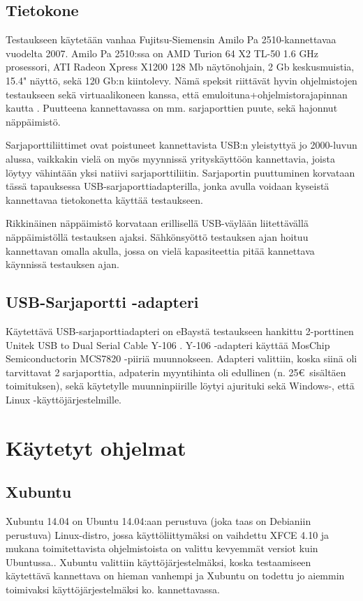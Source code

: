 \documentclass[11pt,a4paper,oneside,article]{memoir}
\begin{document}
\subsection{Tietokone}
Testaukseen käytetään vanhaa Fujitsu-Siemensin Amilo Pa 2510-kannettavaa vuodelta 2007. Amilo Pa 2510:ssa on AMD Turion 64 X2 TL-50 1.6 GHz prosessori, ATI Radeon Xpress X1200 128 Mb näytönohjain, 2 Gb keskusmuistia, 15.4" näyttö, sekä 120 Gb:n kiintolevy. Nämä speksit riittävät hyvin ohjelmistojen testaukseen sekä virtuaalikoneen kanssa, että emuloituna+ohjelmistorajapinnan kautta \cite{fs_amilo:review}. Puutteena kannettavassa on mm. sarjaporttien puute, sekä hajonnut näppäimistö. 

Sarjaporttiliittimet ovat poistuneet kannettavista USB:n yleistyttyä jo 2000-luvun alussa, vaikkakin vielä on myös myynnissä yrityskäyttöön kannettavia, joista löytyy vähintään yksi natiivi sarjaporttiliitin\cite{hp:laptop}. Sarjaportin puuttuminen korvataan tässä tapauksessa USB-sarjaporttiadapterilla, jonka avulla voidaan kyseistä kannettavaa tietokonetta käyttää testaukseen.

Rikkinäinen näppäimistö korvataan erillisellä USB-väylään liitettävällä näppäimistöllä testauksen ajaksi. Sähkönsyöttö testauksen ajan hoituu kannettavan omalla akulla, jossa on vielä kapasiteettia pitää kannettava käynnissä testauksen ajan.

\subsection{USB-Sarjaportti -adapteri}
Käytettävä USB-sarjaporttiadapteri on eBaystä testaukseen hankittu 2-porttinen Unitek USB to Dual Serial Cable Y-106 \cite{serial:unitek}. Y-106 -adapteri käyttää MosChip Semiconductorin MCS7820 -piiriä muunnokseen. Adapteri valittiin, koska siinä oli tarvittavat 2 sarjaporttia, adpaterin myyntihinta oli edullinen (n. 25€ sisältäen toimituksen), sekä käytetylle muunninpiirille löytyi ajurituki sekä Windows-, että Linux -käyttöjärjestelmille.


\section{Käytetyt ohjelmat}
\subsection{Xubuntu}

Xubuntu 14.04 on Ubuntu 14.04:aan perustuva (joka taas on Debianiin perustuva) Linux-distro, jossa 
käyttöliittymäksi on vaihdettu XFCE 4.10 ja mukana toimitettavista ohjelmistoista on valittu kevyemmät 
versiot kuin Ubuntussa.\cite{xubuntu:about}. Xubuntu valittiin käyttöjärjestelmäksi, koska testaamiseen 
käytettävä kannettava on hieman vanhempi ja Xubuntu on todettu jo aiemmin toimivaksi käyttöjärjestelmäksi ko. kannettavassa.
\end{document}
